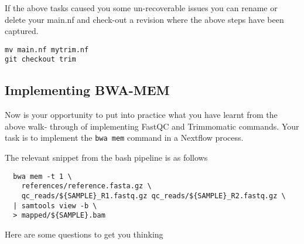 

\begin{note}
If the above tasks caused you some un-recoverable issues you can rename or delete your main.nf and check-out a revision where the above steps have been captured.
\begin{lstlisting}
mv main.nf mytrim.nf
git checkout trim
\end{lstlisting}
\end{note}


\subsection{Implementing BWA-MEM}

Now is your opportunity to put into practice what you have learnt from the above walk-
through of implementing FastQC and Trimmomatic commands. Your task is to implement
the \texttt{bwa mem} command in a Nextflow process.


The relevant snippet from the bash pipeline is as follows 
\begin{lstlisting}
  bwa mem -t 1 \
    references/reference.fasta.gz \
    qc_reads/${SAMPLE}_R1.fastq.gz qc_reads/${SAMPLE}_R2.fastq.gz \
  | samtools view -b \
  > mapped/${SAMPLE}.bam
\end{lstlisting}

Here are some questions to get you thinking 

